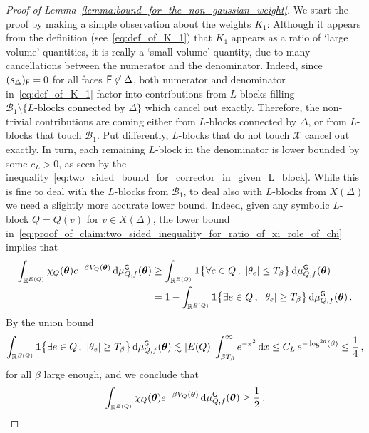 \documentclass[11pt]{article}
\theoremstyle{definition}
\theoremstyle{remark}
\numberwithin{theorem}{section}
\newcommand{\bR}{\mathbb R}
\begin{document}
    \begin{proof}[Proof of Lemma~\ref{lemma:bound_for_the_non_gaussian_weight}]
        We start the proof by making a simple observation about the weights $K_1$: 
        Although it appears from the definition (see~\eqref{eq:def_of_K_1}) that $K_1$ appears as a ratio of `large volume' quantities, it is really a `small volume' quantity, due to many cancellations between the numerator and the denominator. Indeed, since $(s_\Delta)_{\sf F} = 0$ for all faces ${\sf F}\not\in \Delta$, both numerator and denominator in~\eqref{eq:def_of_K_1} factor into contributions from $L$-blocks filling $\mathcal{B}_1\setminus \{L\text{-blocks connected by } \Delta \}$ which cancel out exactly. Therefore, the non-trivial contributions are coming either from $L$-blocks connected by $\Delta$, or from $L$-blocks that touch $\mathcal{B}_1$. 
       Put differently, $L$-blocks that do not touch $\mathcal{X}$ cancel out exactly. In turn, each remaining $L$-block in the denominator is lower bounded by some $c_L>0$, as seen by the inequality~\eqref{eq:two_sided_bound_for_corrector_in_given_L_block}. While this is fine to deal with the $L$-blocks from $\mathcal{B}_1$, to deal also with $L$-blocks from $X(\Delta)$ we need a slightly more accurate lower bound. Indeed, given any symbolic $L$-block $Q=Q(v)$ for $v\in X(\Delta)$, the lower bound in~\eqref{eq:proof_of_claim:two_sided_inequality_for_ratio_of_xi_role_of_chi} implies that 
        \begin{align*}
        \int_{\bR^{E(Q)}} \chi_{Q}(\boldsymbol{\theta})  e^{-\beta V_{Q}(\boldsymbol{\theta})} \, {\rm d}\mu_{Q,f}^{\sf G}(\boldsymbol{\theta}) &\ge \int_{\bR^{E(Q)}} \mathbf{1} \big\{\forall e\in Q \, , \  |\theta_e| \le T_\beta  \big\} \, {\rm d}\mu_{Q,f}^{\sf G}(\boldsymbol{\theta})   \\ &= 1- \int_{\bR^{E(Q)}} \mathbf{1} \big\{\exists e\in Q \, , \  |\theta_e| \ge T_\beta  \big\} \, {\rm d}\mu_{Q,f}^{\sf G}(\boldsymbol{\theta}) \, .
        \end{align*}
        By the union bound
        \[
        \int_{\bR^{E(Q)}} \mathbf{1} \big\{\exists e\in Q \, , \  |\theta_e| \ge T_\beta  \big\} \, {\rm d}\mu_{Q,f}^{\sf G}(\boldsymbol{\theta}) \lesssim |E(Q)| \int_{\beta T_\beta}^\infty e^{-x^2} \, {\rm d}x \le C_L \, e^{-\log^{2d}(\beta)}\le \frac{1}{4} \, ,
        \]
        for all $\beta$ large enough, and we conclude that 
        \[
        \int_{\bR^{E(Q)}} \chi_{Q}(\boldsymbol{\theta})  e^{-\beta V_{Q}(\boldsymbol{\theta})} \, {\rm d}\mu_{Q,f}^{\sf G}(\boldsymbol{\theta}) \ge \frac{1}{2} \, .
\]
\end{proof}
\end{document}
